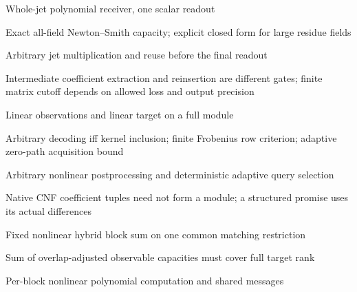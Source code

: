\documentclass[11pt,a4paper]{article}
\newlength{\OfflineResearchTableWidth}
\newcommand{\OfflineResearchRow}{\par}
\newenvironment{OfflineResearchTable}{%
  \par\medskip\begingroup\small\setlength{\parindent}{0pt}%
  \setlength{\parskip}{3pt plus 1pt minus .5pt}%
  \setlength{\OfflineResearchTableWidth}{\linewidth}%
}{%
  \par\endgroup\medskip%
}
\begin{document}
\begin{OfflineResearchTable}
\begin{minipage}[t]{0.17955\OfflineResearchTableWidth}
Whole-jet polynomial receiver, one scalar readout
\end{minipage}\hfill%
\begin{minipage}[t]{0.22680\OfflineResearchTableWidth}\raggedright
Exact all-field
Newton--Smith capacity; explicit closed form for large residue fields
\end{minipage}\hfill%
\begin{minipage}[t]{0.23625\OfflineResearchTableWidth}\raggedright
Arbitrary jet multiplication and reuse before the final readout
\end{minipage}\hfill%
\begin{minipage}[t]{0.30240\OfflineResearchTableWidth}\raggedright
Intermediate coefficient extraction and reinsertion are different gates;
finite matrix cutoff depends on allowed loss and output precision
\end{minipage}%
\OfflineResearchRow
\noindent%
\begin{minipage}[t]{0.17955\OfflineResearchTableWidth}\raggedright
Linear observations and linear target on a full module
\end{minipage}\hfill%
\begin{minipage}[t]{0.22680\OfflineResearchTableWidth}\raggedright
Arbitrary
decoding iff kernel inclusion; finite Frobenius row criterion; adaptive
zero-path acquisition bound
\end{minipage}\hfill%
\begin{minipage}[t]{0.23625\OfflineResearchTableWidth}\raggedright
Arbitrary nonlinear postprocessing and
deterministic adaptive query selection
\end{minipage}\hfill%
\begin{minipage}[t]{0.30240\OfflineResearchTableWidth}\raggedright
Native CNF coefficient tuples
need not form a module; a structured promise uses its actual
differences
\end{minipage}%
\OfflineResearchRow
\noindent%
\begin{minipage}[t]{0.17955\OfflineResearchTableWidth}\raggedright
Fixed nonlinear hybrid block sum on one common matching restriction
\end{minipage}\hfill%
\begin{minipage}[t]{0.22680\OfflineResearchTableWidth}\raggedright
Sum of overlap-adjusted observable capacities must cover full target
rank
\end{minipage}\hfill%
\begin{minipage}[t]{0.23625\OfflineResearchTableWidth}\raggedright
Per-block nonlinear polynomial computation and shared messages

\end{minipage}
\end{OfflineResearchTable}
\end{document}
